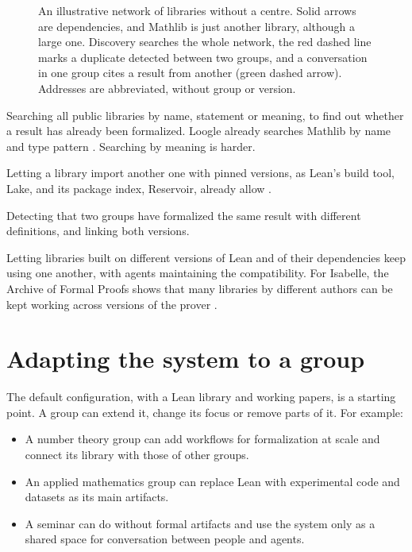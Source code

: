 \documentclass{article}
\begin{document}
\begin{figure}[b]
\centering
%
\caption{An illustrative network of libraries without a centre. Solid arrows are dependencies, and Mathlib is just another library, although a large one. Discovery searches the whole network, the red dashed line marks a duplicate detected between two groups, and a conversation in one group cites a result from another (green dashed arrow). Addresses are abbreviated, without group or version.}\label{fig-red}
\end{figure}

\begin{terms}
\item[Discovery] Searching all public libraries by name, statement or meaning, to find out whether a result has already been formalized. Loogle already searches Mathlib by name and type pattern \cite{loogle}. Searching by meaning is harder.
\item[Dependencies] Letting a library import another one with pinned versions, as Lean's build tool, Lake, and its package index, Reservoir, already allow \cite{reservoir}.
\item[Duplicate detection] Detecting that two groups have formalized the same result with different definitions, and linking both versions.
\item[Version compatibility] Letting libraries built on different versions of Lean and of their dependencies keep using one another, with agents maintaining the compatibility. For Isabelle, the Archive of Formal Proofs shows that many libraries by different authors can be kept working across versions of the prover \cite{afp}.
\end{terms}

\section{Adapting the system to a group}\label{sec-adaptacion}

The default configuration, with a Lean library and working papers, is a starting point. A group can extend it, change its focus or remove parts of it. For example:

\begin{itemize}
\item A number theory group can add workflows for formalization at scale and connect its library with those of other groups.
\item An applied mathematics group can replace Lean with experimental code and datasets as its main artifacts.
\item A seminar can do without formal artifacts and use the system only as a shared space for conversation between people and agents.
\end{itemize}
\end{document}
